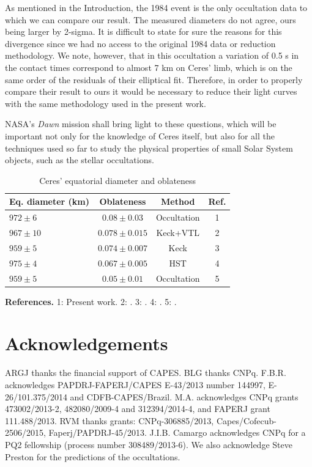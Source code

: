\documentclass[useAMS,usenatbib]{mn2e}
\begin{document}
As mentioned in the Introduction, the 1984 event \citep{Millis1987} is the only occultation data to which we can compare our result. The measured diameters do not agree, ours being larger by 2-sigma. It is difficult to state for sure the reasons for this divergence since we had no access to the original 1984 data or reduction methodology. We note, however, that in this occultation a variation of 0.5 s in the contact times correspond to almost 7 km on Ceres' limb, which is on the same order of the residuals of their elliptical fit. Therefore, in order to properly compare their result to ours it would be necessary to reduce their light curves with the same methodology used in the present work.

NASA's \textit{Dawn} mission shall bring light to these questions, which will be important not only for the knowledge of Ceres itself, but also for all the techniques used so far to study the physical properties of small Solar System objects, such as the stellar occultations.

\begin{table}
  \caption{Ceres' equatorial diameter and oblateness \label{Tab: Ceres-final}}
  \begin{centering}
  \begin{tabular}{@{}lccc}
  \hline
     Eq. diameter (km) & Oblateness & Method & Ref. \\
\hline
$972 \pm 6$  & $0.08  \pm 0.03$  & Occultation & 1\\
$967 \pm 10$ & $0.078 \pm 0.015$ & Keck+VTL    & 2 \\
$959 \pm 5$  & $0.074 \pm 0.007$ & Keck        & 3\\
$975 \pm 4$  & $0.067 \pm 0.005$ & HST         & 4\\
$959 \pm 5$  & $0.05  \pm 0.01$  & Occultation & 5\\
\hline
\end{tabular}
\par\end{centering}
\textbf{References.} 1: Present work. 2: \cite{Drummond2014}. 3: \cite{Carry2008}. 4: \cite{Thomas2005}. 5: \cite{Millis1987}.
\end{table}




\section*{Acknowledgements}

ARGJ thanks the financial support of CAPES. BLG thanks CNPq. F.B.R. acknowledges PAPDRJ-FAPERJ/CAPES E-43/2013 number 144997, E-26/101.375/2014 and CDFB-CAPES/Brazil. M.A. acknowledges CNPq grants 473002/2013-2, 482080/2009-4 and 312394/2014-4, and FAPERJ grant 111.488/2013. RVM thanks grants: CNPq-306885/2013, Capes/Cofecub-2506/2015, Faperj/PAPDRJ-45/2013. J.I.B. Camargo acknowledges CNPq for a PQ2 fellowship (process number 308489/2013-6). We also acknowledge Steve Preston for the predictions of the occultations.
\end{document}
